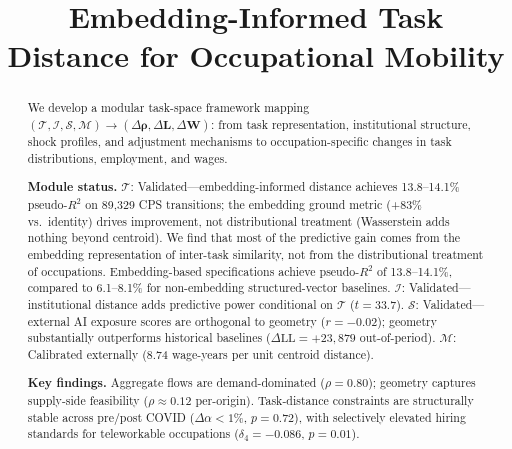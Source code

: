 \documentclass[12pt]{article}
\begin{document}


\title{Embedding-Informed Task Distance for Occupational Mobility}

\maketitle


\begin{abstract}
We develop a modular task-space framework mapping $(\mathcal{T}, \mathcal{I}, \mathcal{S}, \mathcal{M}) \to (\Delta\boldsymbol{\rho}, \Delta \mathbf{L}, \Delta \mathbf{W})$: from task representation, institutional structure, shock profiles, and adjustment mechanisms to occupation-specific changes in task distributions, employment, and wages.

\textbf{Module status.} $\mathcal{T}$: Validated---embedding-informed distance achieves 13.8--14.1\% pseudo-$R^2$ on 89,329 CPS transitions; the embedding ground metric (+83\% vs.\ identity) drives improvement, not distributional treatment (Wasserstein adds nothing beyond centroid). We find that most of the predictive gain comes from the embedding representation of inter-task similarity, not from the distributional treatment of occupations. Embedding-based specifications achieve pseudo-$R^2$ of 13.8--14.1\%, compared to 6.1--8.1\% for non-embedding structured-vector baselines. $\mathcal{I}$: Validated---institutional distance adds predictive power conditional on $\mathcal{T}$ ($t = 33.7$). $\mathcal{S}$: Validated---external AI exposure scores are orthogonal to geometry ($r = -0.02$); geometry substantially outperforms historical baselines ($\Delta\text{LL} = +23{,}879$ out-of-period). $\mathcal{M}$: Calibrated externally (8.74 wage-years per unit centroid distance).

\textbf{Key findings.} Aggregate flows are demand-dominated ($\rho = 0.80$); geometry captures supply-side feasibility ($\rho \approx 0.12$ per-origin). Task-distance constraints are structurally stable across pre/post COVID ($\Delta\alpha < 1\%$, $p = 0.72$), with selectively elevated hiring standards for teleworkable occupations ($\delta_4 = -0.086$, $p = 0.01$).

\end{abstract}
\end{document}

